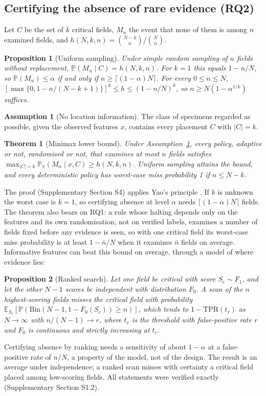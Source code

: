 \documentclass[preprint,12pt]{elsarticle}
\newtheorem{proposition}{Proposition}
\newtheorem{theorem}{Theorem}
\theoremstyle{remark}
\theoremstyle{definition}
\newtheorem{assumption}{Assumption}
\newcommand{\Prb}{\mathbb{P}}
\newcommand{\E}{\mathbb{E}}
\begin{document}
\subsection{Certifying the absence of rare evidence (RQ2)}
Let $C$ be the set of $k$ critical fields, $M_n$ the event that none of them is among $n$ examined fields, and $h(N,k,n)=\binom{N-k}{n}/\binom{N}{n}$.
\begin{proposition}[Uniform sampling]\label{prop:uniform}
Under simple random sampling of $n$ fields without replacement, $\Prb(M_n\mid C)=h(N,k,n)$. For $k=1$ this equals $1-n/N$, so $\Prb(M_n)\le\alpha$ if and only if $n\ge\lceil(1-\alpha)N\rceil$. For every $0\le n\le N$, $[\max\{0,1-n/(N-k+1)\}]^k\le h\le(1-n/N)^k$, so $n\ge N(1-\alpha^{1/k})$ suffices.
\end{proposition}
\begin{assumption}[No location information]\label{ass:A}
The class of specimens regarded as possible, given the observed features $x$, contains every placement $C$ with $|C|=k$.
\end{assumption}
\begin{theorem}[Minimax lower bound]\label{thm:minimax}
Under Assumption~\ref{ass:A}, every policy, adaptive or not, randomised or not, that examines at most $n$ fields satisfies $\max_{|C|=k}\Prb_\pi(M_n\mid x,C)\ge h(N,k,n)$. Uniform sampling attains the bound, and every deterministic policy has worst-case miss probability 1 if $n\le N-k$.
\end{theorem}
The proof (Supplementary Section S4) applies Yao's principle \cite{yao1977}. If $k$ is unknown the worst case is $k=1$, so certifying absence at level $\alpha$ needs $\lceil(1-\alpha)N\rceil$ fields. The theorem also bears on RQ1: a rule whose halting depends only on the features and its own randomisation, not on verified labels, examines a number of fields fixed before any evidence is seen, so with one critical field its worst-case miss probability is at least $1-\bar n/N$ when it examines $\bar n$ fields on average. Informative features can beat this bound on average, through a model of where evidence lies:
\begin{proposition}[Ranked search]\label{prop:bridge}
Let one field be critical with score $S_c\sim F_1$, and let the other $N-1$ scores be independent with distribution $F_0$. A scan of the $n$ highest-scoring fields misses the critical field with probability $\E_{S_c}[\Prb(\mathrm{Bin}(N-1,1-F_0(S_c))\ge n)]$, which tends to $1-\mathrm{TPR}(t_r)$ as $N\to\infty$ with $n/(N-1)\to r$, where $t_r$ is the threshold with false-positive rate $r$ and $F_0$ is continuous and strictly increasing at $t_r$.
\end{proposition}
Certifying absence by ranking needs a sensitivity of about $1-\alpha$ at a false-positive rate of $n/N$, a property of the model, not of the design. The result is an average under independence; a ranked scan misses with certainty a critical field placed among low-scoring fields. All statements were verified exactly (Supplementary Section S1.2).
\end{document}
